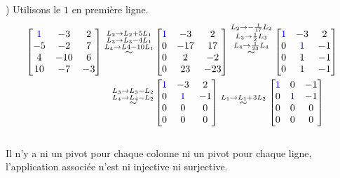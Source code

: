 \documentclass{article}
\begin{document}
) Utilisons le $1$ en première ligne.
\begin{align*}
    \begin{bmatrix}
    \color{blue}1 & -3 & 2 \\
    -5 & -2  & 7  \\
    4 & -10  & 6 \\
    10 & -7 & -3
    \end{bmatrix}
    \overset{\substack{L_2 \to L_2 + 5L_1 \\ L_3 \to L_3 - 4L_1\\ L_4 \to L4 - 10L_1}}{\sim}
    &\begin{bmatrix}
    \color{blue}1 & -3 & 2 \\
    0 & -17  & 17  \\
    0 & 2  & -2 \\
    0 & 23 & -23
    \end{bmatrix}
    \overset{\substack{L_2 \to -\frac{1}{17}L_2 \\ L_3 \to \frac{1}{2}L_3 \\ L_4 \to \frac{1}{23}L_4}}{\sim}
    \begin{bmatrix}
    \color{blue}1 & -3 & 2 \\
    0 & \color{blue}1  & -1  \\
    0 & 1  & -1  \\
    0 & 1  & -1 
    \end{bmatrix}\\
    \overset{\substack{L_3 \to L_3 - L_2 \\ L_4 \to L_4 - L_2}}{\sim}
    &\begin{bmatrix}
    \color{blue}1 & -3 & 2 \\
    0 & \color{blue}1  & -1  \\
    0 & 0  & 0  \\
    0 & 0  & 0 
    \end{bmatrix}
    \overset{L_1 \to L_1 + 3L_2}{\sim}
    \begin{bmatrix}
    \color{blue}1 & 0 & -1 \\
    0 & \color{blue}1  & -1  \\
    0 & 0  & 0  \\
    0 & 0  & 0 
    \end{bmatrix}
\end{align*}\\

\noindent Il n'y a ni un pivot pour chaque colonne ni un pivot pour chaque ligne, l'application associée n'est ni injective ni surjective.\\
\end{document}
